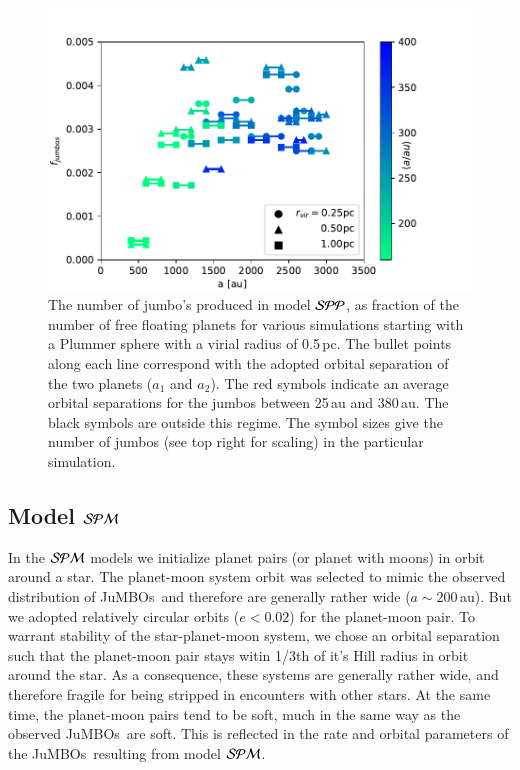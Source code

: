 \documentclass[aa]{lib/aa}
\newcommand{\jumbos}{\mbox{JuMBOs}}
\begin{document}
\begin{figure}
    \centering
        \includegraphics[width=.91\columnwidth]{figures/fig_fjumbos_from_psystems.pdf}
        \caption{The number of jumbo's produced in model ${\cal SPP}$,
          as fraction of the number of free floating planets for
          various simulations starting with a Plummer sphere with a
          virial radius of 0.5\,pc.  The bullet points along each line
          correspond with the adopted orbital separation of the two
          planets ($a_1$ and $a_2$).  The red symbols indicate an
          average orbital separations for the jumbos between 25\,au
          and 380\,au.  The black symbols are outside this regime.
          The symbol sizes give the number of jumbos (see top right
          for scaling) in the particular simulation.  }
         \label{Fig:fjumbos_from_PP}
\end{figure}

\subsection{Model ${\cal SPM}$}

In the ${\cal SPM}$ models we initialize planet pairs (or planet with
moons) in orbit around a star. The planet-moon system orbit was
selected to mimic the observed distribution of \jumbos\, and therefore
are generally rather wide ($a \sim 200$\,au). But we adopted
relatively circular orbits ($e<0.02$) for the planet-moon pair.  To
warrant stability of the star-planet-moon system, we chose an orbital
separation such that the planet-moon pair stays witin 1/3th of it's
Hill radius in orbit around the star. As a consequence, these systems
are generally rather wide, and therefore fragile for being stripped in
encounters with other stars. At the same time, the planet-moon pairs
tend to be soft, much in the same way as the observed \jumbos\, are
soft. This is reflected in the rate and orbital parameters of the
\jumbos\, resulting from model ${\cal SPM}$.
\end{document}
